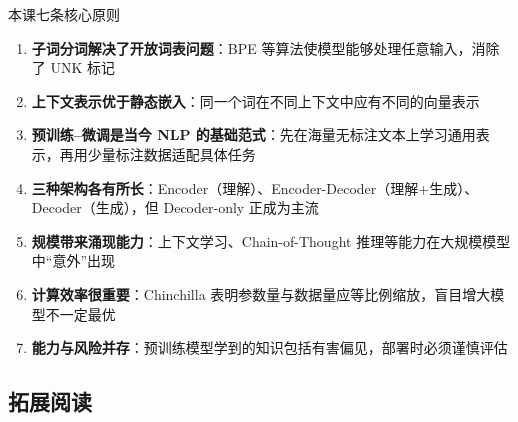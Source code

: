 \begin{importantbox}{本课七条核心原则}
\begin{enumerate}
    \item \textbf{子词分词解决了开放词表问题}：BPE 等算法使模型能够处理任意输入，消除了 UNK 标记
    \item \textbf{上下文表示优于静态嵌入}：同一个词在不同上下文中应有不同的向量表示
    \item \textbf{预训练--微调是当今 NLP 的基础范式}：先在海量无标注文本上学习通用表示，再用少量标注数据适配具体任务
    \item \textbf{三种架构各有所长}：Encoder（理解）、Encoder-Decoder（理解+生成）、Decoder（生成），但 Decoder-only 正成为主流
    \item \textbf{规模带来涌现能力}：上下文学习、Chain-of-Thought 推理等能力在大规模模型中``意外''出现
    \item \textbf{计算效率很重要}：Chinchilla 表明参数量与数据量应等比例缩放，盲目增大模型不一定最优
    \item \textbf{能力与风险并存}：预训练模型学到的知识包括有害偏见，部署时必须谨慎评估
\end{enumerate}
\end{importantbox}

\subsection{拓展阅读}

